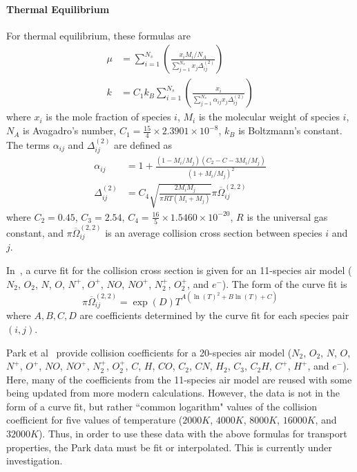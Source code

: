 \paragraph{Thermal Equilibrium}
For thermal
equilibrium, these formulas are
%
\begin{equation} \label{eq:GY-mu-k}
\begin{split}
\mu &= \sum_{i = 1}^{N_s} \left( \frac{ x_i M_i/N_A}{ \sum_{j = 1}^{N_s} x_j \Delta_{ij}^{(2)} }\right) \\
k &= C_1 k_B \sum_{i=1}^{N_s} \left( \frac{x_i}{\sum_{j=1}^{N_s} \alpha_{ij} x_j \Delta_{ij}^{(2)}} \right)
\end{split}
\end{equation}
%
where $x_i$ is the mole fraction of species $i$, $M_i$ is the molecular weight of species $i$, $N_A$ is Avagadro's number, 
$C_1 = \frac{15}{4}\times 2.3901\times 10^{-8}$, $k_B$ is Boltzmann's constant. The terms $\alpha_{ij}$ and $\Delta_{ij}^{(2)}$
are defined as
%
\begin{equation}
\begin{split}
\alpha_{ij} &= 1 + \frac{\left(1 - M_i/M_j\right)\left(C_2 - C-3 M_i/M_j \right)}{\left( 1 + M_i/M_j \right)^2}\\
\Delta_{ij}^{(2)} &= C_4 \sqrt{\frac{2 M_i M_j}{\pi R T\left( M_i + M_j\right)}} \pi \overline{\Omega}_{ij}^{(2,2)}
\end{split}
\end{equation}
%
where $C_2 = 0.45$, $C_3 = 2.54$, $C_4 = \frac{16}{5}\times 1.5460 \times 10^{-20}$, $R$ is the universal gas constant,
and $\pi \overline{\Omega}_{ij}^{(2,2)}$ is an average collision cross section between species $i$ and $j$.

In~\cite{GuptaYosetal1990}, a curve fit for the collision cross section is given for an 
11-species air model ($N_2$, $O_2$, $N$, $O$, $N^+$, $O^+$, $NO$, $NO^+$, $N_2^+$, $O_2^+$, and $e^-$). The form
of the curve fit is
%
\begin{equation} \label{eq:Omega_curve_fit}
\pi \overline{\Omega}_{ij}^{(2,2)} = \exp(D) T^{A(\ln(T)^2 + B\ln(T) + C)}
\end{equation}
%
where $A, B, C, D$ are coefficients determined by the curve fit for each species pair $(i,j)$.

Park et al~\cite{ParkJaffeetal2001} provide collision coefficients for a 20-species air model ($N_2$, $O_2$, $N$, $O$, 
$N^+$, $O^+$, $NO$, $NO^+$, $N_2^+$, $O_2^+$, $C$, $H$, $CO$, $C_2$, $CN$, $H_2$, $C_3$, $C_2H$, $C^+$,
$H^+$, and $e^-$). Here, many of the coefficients from the 11-species air model are reused with some being updated
from more modern calculations. However, the data is not in the form of a curve fit, but rather ``common logarithm" values
of the collision coefficient for five values of temperature ($2000 K$, $4000 K$, $8000 K$, $16000 K$, and $32000 K$). Thus,
in order to use these data with the above formulas for transport properties, the Park data must be fit or interpolated. This is
currently under investigation.

